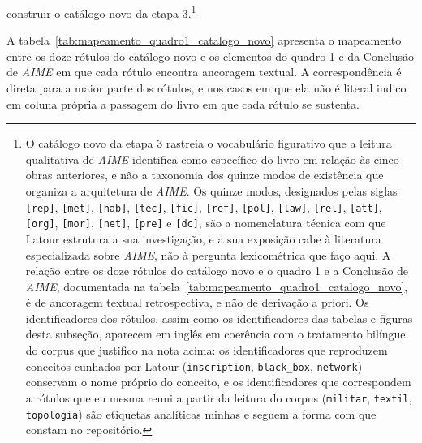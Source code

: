 construir o catálogo novo da etapa  3.\footnote{O catálogo novo da etapa  3 rastreia o vocabulário figurativo que a leitura qualitativa de \textit{AIME} identifica como específico do livro em relação às cinco obras anteriores, e não a taxonomia dos quinze modos de existência que organiza a arquitetura de \textit{AIME}. Os quinze modos, designados pelas siglas \texttt{[rep]}, \texttt{[met]}, \texttt{[hab]}, \texttt{[tec]}, \texttt{[fic]}, \texttt{[ref]}, \texttt{[pol]}, \texttt{[law]}, \texttt{[rel]}, \texttt{[att]}, \texttt{[org]}, \texttt{[mor]}, \texttt{[net]}, \texttt{[pre]} e \texttt{[dc]}, são a nomenclatura técnica com que Latour estrutura a sua investigação, e a sua exposição cabe à literatura especializada sobre \textit{AIME}, não à pergunta lexicométrica que faço aqui. A relação entre os doze rótulos do catálogo novo e o quadro 1 e a Conclusão de \textit{AIME}, documentada na tabela~\ref{tab:mapeamento_quadro1_catalogo_novo}, é de ancoragem textual retrospectiva, e não de derivação a priori. Os identificadores dos rótulos, assim como os identificadores das tabelas e figuras desta subseção, aparecem em inglês em coerência com o tratamento bilíngue do corpus que justifico na nota acima: os identificadores que reproduzem conceitos cunhados por Latour (\texttt{inscription}, \texttt{black\_box}, \texttt{network}) conservam o nome próprio do conceito, e os identificadores que correspondem a rótulos que eu mesma reuni a partir da leitura do corpus (\texttt{militar}, \texttt{textil}, \texttt{topologia}) são etiquetas analíticas minhas e seguem a forma com que constam no repositório.}

A tabela~\ref{tab:mapeamento_quadro1_catalogo_novo} apresenta o mapeamento entre os doze rótulos do catálogo novo e os elementos do quadro 1 e da Conclusão de \textit{AIME} em que cada rótulo encontra ancoragem textual. A correspondência é direta para a maior parte dos rótulos, e nos casos em que ela não é literal indico em coluna própria a passagem do livro em que cada rótulo se sustenta.

